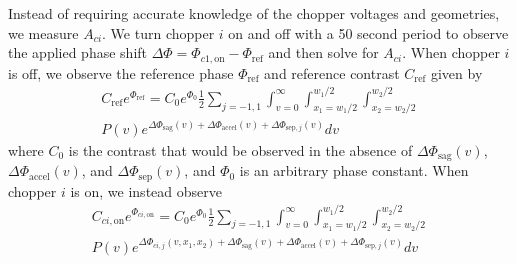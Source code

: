\documentclass[twocolumn,prl,showpacs,superscriptaddress]{revtex4-1}   %
\newcommand{\eqnref}[1]{Eqn. \eqref{#1}}
\newcommand{\dphisep}{\Delta\Phi_{\mathrm{sep}}}
\newcommand{\dphisepj}{\Delta\Phi_{\mathrm{sep},j}}
\newcommand{\dphisag}{\Delta\Phi_{\mathrm{sag}}}
\newcommand{\dphiaccel}{\Delta\Phi_{\mathrm{accel}}}
\begin{document}

Instead of requiring accurate knowledge of the chopper voltages and geometries, we measure $A_{ci}$. We turn chopper $i$ on and off with a 50 second period to observe the applied phase shift $\Delta\Phi = \Phi_{c1,\mathrm{on}} - \Phi_{\mathrm{ref}}$ and then solve for $A_{ci}$. When chopper $i$ is off, we observe the reference phase $\Phi_{\mathrm{ref}}$ and reference contrast $C_{\mathrm{ref}}$ given by 
\begin{align}
	C_{\mathrm{ref}}e^{\Phi_{\mathrm{ref}}} = 
		C_0e^{\Phi_0} \frac{1}{2} \sum_{j=-1,1}
		\int_{v=0}^{\infty}
		\int_{x_1=w_1/2}^{w_1/2}
		\int_{x_2=w_2/2}^{w_2/2} 
		\nonumber \\
		P(v) e^{\dphisag(v) + \dphiaccel(v) + \dphisepj(v)} 
		dv
	\label{CPChoppersRef}
\end{align}
where $C_0$ is the contrast that would be observed in the absence of $\dphisag(v)$, $\dphiaccel(v)$, and $\dphisep(v)$, and $\Phi_0$ is an arbitrary phase constant. When chopper $i$ is on, we instead observe
\begin{align}
	C_{ci,\mathrm{on}}e^{\Phi_{ci,\mathrm{on}}} = 
		C_0e^{\Phi_0} \frac{1}{2} \sum_{j=-1,1}
		\int_{v=0}^{\infty}
		\int_{x_1=w_1/2}^{w_1/2}
		\int_{x_2=w_2/2}^{w_2/2} 
		\nonumber \\
		P(v) e^{\Delta\Phi_{ci,j}(v,x_1,x_2) + \dphisag(v) + \dphiaccel(v) + \dphisepj(v)} 
		dv
	\label{CPChoppersOn}
\end{align}
\end{document}
